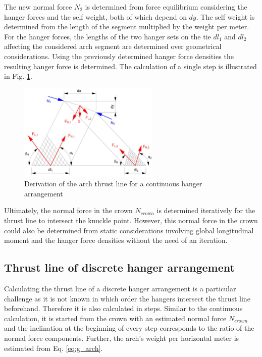The new normal force $N_2$ is determined from force equilibrium considering the hanger forces and the self weight, both of which depend on $dy$. The self weight is determined from the length of the segment multiplied by the weight per meter. For the hanger forces, the lengths of the two hanger sets on the tie $dl_1$ and $dl_2$ affecting the considered arch segment are determined over geometrical considerations. Using the previously determined hanger force densities the resulting hanger force is determined. The calculation of a single step is illustrated in Fig. \cref{fig:continuous_2}.
\begin{figure}[H]
    \centering
    \includegraphics[width=0.6\textwidth]{overleaf/Appendix/Pictures/continuous_thrust_line.PNG}
    \caption{Derivation of the arch thrust line for a continuous hanger arrangement}
    \label{fig:continuous_2}
\end{figure}

Ultimately, the normal force in the crown $N_{crown}$ is determined iteratively for the thrust line to intersect the knuckle point. However, this normal force in the crown could also be determined from static considerations involving global longitudinal moment and the hanger force densities without the need of an iteration.


\subsection{Thrust line of discrete hanger arrangement}\label{app:discrete}

Calculating the thrust line of a discrete hanger arrangement is a particular challenge as it is not known in which order the hangers intersect the thrust line beforehand. Therefore it is also calculated in steps. Similar to the continuous calculation, it is started from the crown with an estimated normal force $N_{crown}$ and the inclination at the beginning of every step corresponds to the ratio of the normal force components. Further, the arch's weight per horizontal meter is estimated from Eq. \cref{eq:g_arch}.

